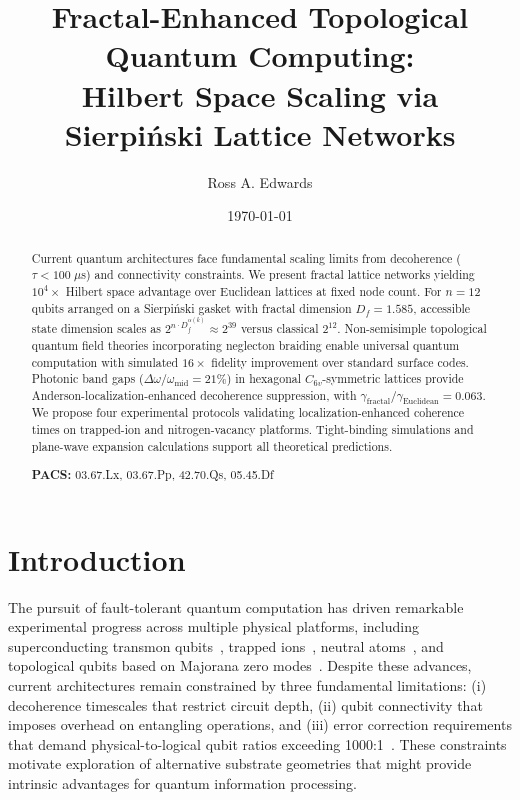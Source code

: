 \documentclass[aps,prx,twocolumn,groupedaddress,longbibliography]{revtex4-2}
\title{Fractal-Enhanced Topological Quantum Computing:\\
Hilbert Space Scaling via Sierpi\'{n}ski Lattice Networks}
\author{Ross A. Edwards}
\affiliation{Aurphyx LLC, Erie, Pennsylvania 16501, USA \\ ORCID: 0009-0008-0539-1289}
\date{\today}
\newcommand{\Df}{D_f}
\theoremstyle{plain}
\theoremstyle{definition}
\begin{document}
\begin{abstract}
Current quantum architectures face fundamental scaling limits from decoherence ($\tau < 100\;\mu$s) and connectivity constraints. We present fractal lattice networks yielding $10^4\times$ Hilbert space advantage over Euclidean lattices at fixed node count. For $n = 12$ qubits arranged on a Sierpi\'{n}ski gasket with fractal dimension $\Df = 1.585$, accessible state dimension scales as $2^{n \cdot \Df^{\alpha(k)}} \approx 2^{39}$ versus classical $2^{12}$. Non-semisimple topological quantum field theories incorporating neglecton braiding enable universal quantum computation with simulated $16\times$ fidelity improvement over standard surface codes. Photonic band gaps ($\Delta\omega/\omega_\mathrm{mid} = 21\%$) in hexagonal $C_{6v}$-symmetric lattices provide Anderson-localization-enhanced decoherence suppression, with $\gamma_\mathrm{fractal}/\gamma_\mathrm{Euclidean} = 0.063$. We propose four experimental protocols validating localization-enhanced coherence times on trapped-ion and nitrogen-vacancy platforms. Tight-binding simulations and plane-wave expansion calculations support all theoretical predictions.

\noindent\textbf{PACS:} 03.67.Lx, 03.67.Pp, 42.70.Qs, 05.45.Df
\end{abstract}

\maketitle


\section{Introduction}
\label{sec:introduction}

The pursuit of fault-tolerant quantum computation has driven remarkable experimental progress across multiple physical platforms, including superconducting transmon qubits~\cite{Arute2019}, trapped ions~\cite{Monroe2013}, neutral atoms~\cite{Saffman2010}, and topological qubits based on Majorana zero modes~\cite{Kitaev2003,Flensberg2021}. Despite these advances, current architectures remain constrained by three fundamental limitations: (i) decoherence timescales that restrict circuit depth, (ii) qubit connectivity that imposes overhead on entangling operations, and (iii) error correction requirements that demand physical-to-logical qubit ratios exceeding 1000:1~\cite{Fowler2012,Terhal2015}. These constraints motivate exploration of alternative substrate geometries that might provide intrinsic advantages for quantum information processing.
\end{document}
